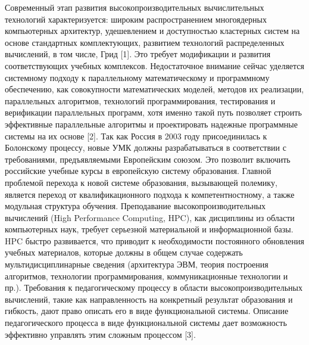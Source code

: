 \documentclass[12pt]{article}
\begin{document}
\indent\indent Современный этап развития высокопроизводительных вычислительных технологий характеризуется: широким распространением многоядерных компьютерных архитектур, удешевлением и доступностью кластерных систем на основе стандартных комплектующих, развитием технологий распределенных вычислений, в том числе, Грид [1]. Это требует модификации и развития соответствующих учебных комплексов. Недостаточное внимание сейчас уделяется системному подходу к параллельному математическому и программному обеспечению, как совокупности математических моделей, методов их реализации, параллельных алгоритмов, технологий программирования, тестирования и верификации параллельных программ, хотя именно такой путь позволяет строить эффективные параллельные алгоритмы и проектировать надежные программные системы на их основе [2]. \newline
\indent Так как Россия в 2003 году присоединилась к Болонскому процессу, новые УМК должны разрабатываться в соответствии с требованиями, предъявляемыми Европейским союзом. Это позволит включить российские учебные курсы в европейскую систему образования. Главной проблемой перехода к новой системе образования, вызывающей полемику, является переход от квалификационного подхода к компетентностному,  а также модульная структура обучения. \newline
\indent Преподавание высокопроизводительных вычислений (High Performance Computing, HPC), как дисциплины из области компьютерных наук, требует серьезной материальной и информационной базы. HPC быстро развивается, что приводит к необходимости постоянного обновления учебных материалов, которые должны в общем случае содержать мультидисциплинарные сведения (архитектура ЭВМ, теория построения алгоритмов, технологии программирования, коммуникационные технологии и пр.). Требования к педагогическому процессу в области высокопроизводительных вычислений, такие как направленность на конкретный результат образования и гибкость, дают право описать его в виде функциональной системы. Описание педагогического процесса в виде функциональной системы дает возможность эффективно управлять этим сложным процессом [3].
\end{document}
